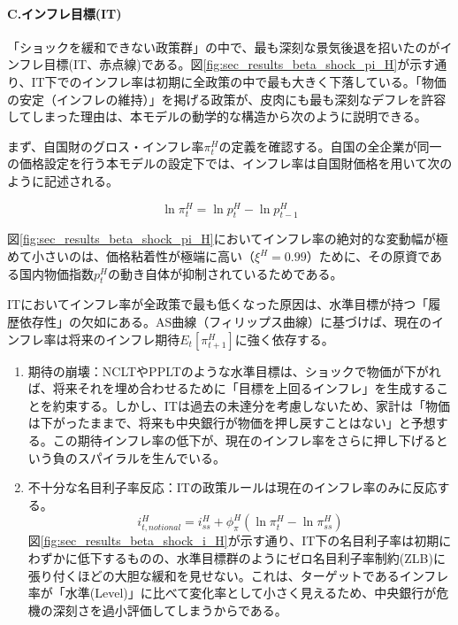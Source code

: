 \paragraph{C.インフレ目標(IT)}\label{sec:sec_results_beta_shock_analysis_it}
「ショックを緩和できない政策群」の中で、最も深刻な景気後退を招いたのがインフレ目標(IT、赤点線)である。図\ref{fig:sec_results_beta_shock_pi_H}が示す通り、IT下でのインフレ率は初期に全政策の中で最も大きく下落している。「物価の安定（インフレの維持）」を掲げる政策が、皮肉にも最も深刻なデフレを許容してしまった理由は、本モデルの動学的な構造から次のように説明できる。

まず、自国財のグロス・インフレ率\(\pi_t^H\)の定義を確認する。自国の全企業が同一の価格設定を行う本モデルの設定下では、インフレ率は自国財価格を用いて次のように記述される。

\begin{equation}
\ln\pi_t^H=\ln p_t^H-\ln p_{t-1}^H
\label{form:sec_results_beta_shock_analysis_it_pi_def}
\end{equation}

図\ref{fig:sec_results_beta_shock_pi_H}においてインフレ率の絶対的な変動幅が極めて小さいのは、価格粘着性が極端に高い（\(\xi^H=0.99\)）ために、その原資である国内物価指数\(p_t^H\)の動き自体が抑制されているためである。

ITにおいてインフレ率が全政策で最も低くなった原因は、水準目標が持つ「履歴依存性」の欠如にある。AS曲線（フィリップス曲線）に基づけば、現在のインフレ率は将来のインフレ期待\(E_t[\pi_{t+1}^H]\)に強く依存する。

\begin{enumerate}
    \item\label{itm:sec_results_beta_shock_analysis_it_expectation} 期待の崩壊：NCLTやPPLTのような水準目標は、ショックで物価が下がれば、将来それを埋め合わせるために「目標を上回るインフレ」を生成することを約束する。しかし、ITは過去の未達分を考慮しないため、家計は「物価は下がったままで、将来も中央銀行が物価を押し戻すことはない」と予想する。この期待インフレ率の低下が、現在のインフレ率をさらに押し下げるという負のスパイラルを生んでいる。
    \item\label{itm:sec_results_beta_shock_analysis_it_reaction} 不十分な名目利子率反応：ITの政策ルールは現在のインフレ率のみに反応する。
    \begin{equation}
    i_{t,notional}^H=i_{ss}^H+\phi_\pi^H(\ln\pi_t^H-\ln\pi_{ss}^H)
    \label{form:sec_results_beta_shock_analysis_it_policy}
    \end{equation}
    図\ref{fig:sec_results_beta_shock_i_H}が示す通り、IT下の名目利子率は初期にわずかに低下するものの、水準目標群のようにゼロ名目利子率制約(ZLB)に張り付くほどの大胆な緩和を見せない。これは、ターゲットであるインフレ率が「水準(Level)」に比べて変化率として小さく見えるため、中央銀行が危機の深刻さを過小評価してしまうからである。
\end{enumerate}

